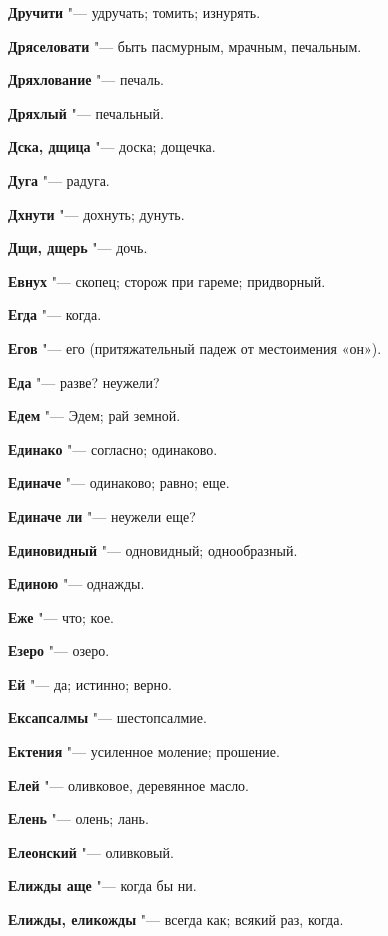 \begin{mymulticols}
\noindent\textbf{Дручити} "--- удручать; томить; изнурять. 

\noindent\textbf{Дряселовати} "--- быть пасмурным, мрачным, печальным. 

\noindent\textbf{Дряхлование} "--- печаль. 

\noindent\textbf{Дряхлый} "--- печальный. 

\noindent\textbf{Дска, дщица} "--- доска; дощечка. 

\noindent\textbf{Дуга} "--- радуга. 

\noindent\textbf{Дхнути} "--- дохнуть; дунуть. 

\noindent\textbf{Дщи, дщерь} "--- дочь. 

\bukvaending


\noindent\textbf{Евнух} "--- скопец; сторож при гареме; придворный. 

\noindent\textbf{Егда} "--- когда. 

\noindent\textbf{Егов} "--- его (притяжательный падеж от местоимения «он»). 

\noindent\textbf{Еда} "--- разве? неужели? 

\noindent\textbf{Едем} "--- Эдем; рай земной. 

\noindent\textbf{Единако} "--- согласно; одинаково. 

\noindent\textbf{Единаче} "--- одинаково; равно; еще. 

\noindent\textbf{Единаче ли} "--- неужели еще? 

\noindent\textbf{Единовидный} "--- одновидный; однообразный. 

\noindent\textbf{Единою} "--- однажды. 

\noindent\textbf{Еже} "--- что; кое. 

\noindent\textbf{Езеро} "--- озеро. 

\noindent\textbf{Ей} "--- да; истинно; верно. 

\noindent\textbf{Ексапсалмы} "--- шестопсалмие. 

\noindent\textbf{Ектения} "--- усиленное моление; прошение. 

\noindent\textbf{Елей} "--- оливковое, деревянное масло. 

\noindent\textbf{Елень} "--- олень; лань. 

\noindent\textbf{Елеонский} "--- оливковый. 

\noindent\textbf{Елижды аще} "--- когда бы ни. 

\noindent\textbf{Елижды, еликожды} "--- всегда как; всякий раз, когда. 


\end{mymulticols}
